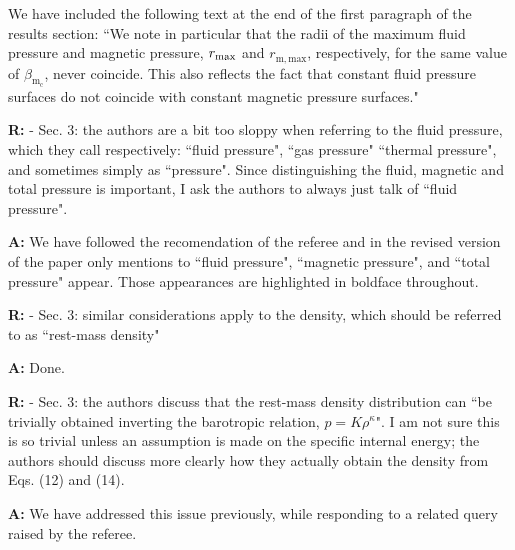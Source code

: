 \documentclass{article}
\begin{document}
\bigskip

We have included the following text at the end of the first paragraph of the results section: ``We note in particular that the radii of the maximum fluid pressure and magnetic pressure, $r_{{\rm{max}}}$ and $r_{{\mathrm{m, max}}}$, respectively, for the same value of $\beta_{\mathrm{m}_{\mathrm{c}}}$, never coincide. This also reflects the fact that constant fluid pressure surfaces do not coincide with constant magnetic pressure surfaces."

\bigskip

{\bf R:} - Sec. 3: the authors are a bit too sloppy when referring to the fluid
pressure, which they call respectively: ``fluid pressure", ``gas
pressure" ``thermal pressure", and sometimes simply as ``pressure". Since
distinguishing the fluid, magnetic and total pressure is important, I
ask the authors to always just talk of ``fluid pressure".

\bigskip

{\bf A:} We have followed the recomendation of the referee and in the revised version
of the paper only mentions to ``fluid pressure", ``magnetic pressure", and 
``total pressure" appear. Those appearances are highlighted in boldface
throughout.

\bigskip

{\bf R:} - Sec. 3: similar considerations apply to the density, which should
be referred to as ``rest-mass density"

\bigskip

{\bf A:} Done.

\bigskip

{\bf R:} - Sec. 3: the authors discuss that the rest-mass density distribution can
``be trivially obtained inverting the barotropic relation, $p = K
\rho^{\kappa}$". I am not sure this is so trivial unless an assumption is
made on the specific internal energy; the authors should discuss more
clearly how they actually obtain the density from Eqs. (12) and (14).

\bigskip

{\bf A:} 
We have addressed this issue previously, while responding to a related query raised by the referee.

\end{document}
